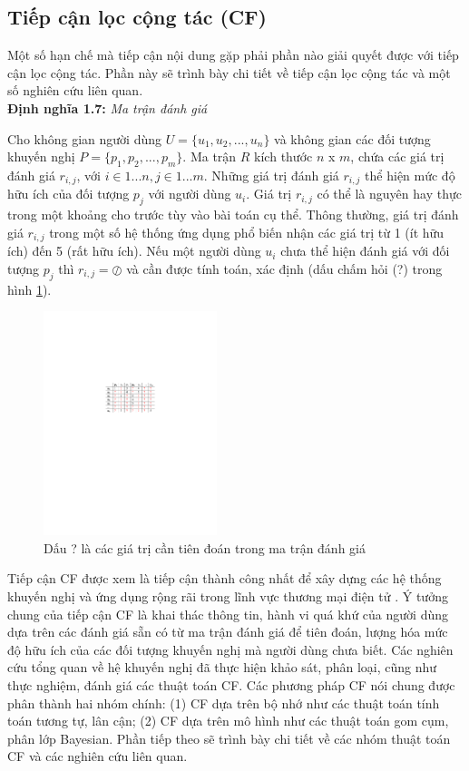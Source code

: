 \subsection{Tiếp cận lọc cộng tác (CF)}
Một số hạn chế mà tiếp cận nội dung gặp phải phần nào giải quyết được với tiếp cận lọc cộng tác. Phần này sẽ trình bày chi tiết về tiếp cận lọc cộng tác và một số nghiên cứu liên quan.\\
\textbf{Định nghĩa 1.7:} \textit{Ma trận đánh giá} \cite{Jannach:2010:RSI, Su:2009:SCF} 

Cho không gian người dùng $U = \{{u_{1}, u_{2}, ..., u_{n}}\}$ và không gian các đối tượng khuyến nghị $P = \{{p_{1}, p_{2}, ..., p_{m}}\}$. Ma trận $R$ kích thước $n$ x $m$, chứa các giá trị đánh giá $r_{i,j}$, với $i \in 1...n, j \in 1...m$. Những giá trị đánh giá $r_{i,j}$ thể hiện mức độ hữu ích của đối tượng $p_{j}$ với người dùng $u_{i}$. Giá trị $r_{i,j}$ có thể là nguyên hay thực trong một khoảng cho trước tùy vào bài toán cụ thể. Thông thường, giá trị đánh giá $r_{i,j}$ trong một số hệ thống ứng dụng phổ biến nhận các giá trị từ 1 (ít hữu ích) đến 5 (rất hữu ích). Nếu một người dùng $u_{i}$ chưa thể hiện đánh giá với đối tượng $p_{j}$ thì $r_{i,j} = \oslash$ và cần được tính toán, xác định (dấu chấm hỏi (?) trong hình \ref{fig:figure_1_1}).
\begin{figure}[ht]
\begin{center}
\advance\leftskip-3cm
\advance\rightskip-3cm
  \includegraphics[width=0.45\textwidth]{Figure_1_1.pdf}
  \caption{Dấu ? là các giá trị cần tiên đoán trong ma trận đánh giá}\label{fig:figure_1_1}
\end{center}
\end{figure}

Tiếp cận CF được xem là tiếp cận thành công nhất để xây dựng các hệ thống khuyến nghị và ứng dụng rộng rãi trong lĩnh vực thương mại điện tử \cite{Su:2009:SCF, Jannach:2010:RSI}. Ý tưởng chung của tiếp cận CF là khai thác thông tin, hành vi quá khứ của người dùng dựa trên các đánh giá sẵn có từ ma trận đánh giá để tiên đoán, lượng hóa mức độ hữu ích của các đối tượng khuyến nghị mà người dùng chưa biết. Các nghiên cứu tổng quan về hệ khuyến nghị đã thực hiện khảo sát, phân loại, cũng như thực nghiệm, đánh giá các thuật toán CF. Các phương pháp CF nói chung được phân thành hai nhóm chính: (1) CF dựa trên bộ nhớ như các thuật toán tính toán tương tự, lân cận; (2) CF dựa trên mô hình như các thuật toán gom cụm, phân lớp Bayesian. Phần tiếp theo sẽ trình bày chi tiết về các nhóm thuật toán CF và các nghiên cứu liên quan. 
